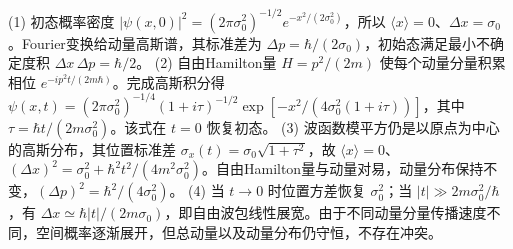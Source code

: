 (1) 初态概率密度 \(|\psi(x,0)|^2=(2\pi\sigma_0^2)^{-1/2}e^{-x^2/(2\sigma_0^2)}\)，所以 \(\langle x\rangle=0\)、\(\Delta x=\sigma_0\)。Fourier变换给动量高斯谱，其标准差为 \(\Delta p=\hbar/(2\sigma_0)\)，初始态满足最小不确定度积 \(\Delta x\,\Delta p=\hbar/2\)。
(2) 自由Hamilton量 \(H=p^2/(2m)\) 使每个动量分量积累相位 \(e^{-ip^2t/(2m\hbar)}\)。完成高斯积分得 \(\psi(x,t)=(2\pi\sigma_0^2)^{-1/4}(1+i\tau)^{-1/2}\exp[-x^2/(4\sigma_0^2(1+i\tau))]\)，其中 \(\tau=\hbar t/(2m\sigma_0^2)\)。该式在 \(t=0\) 恢复初态。
(3) 波函数模平方仍是以原点为中心的高斯分布，其位置标准差 \(\sigma_x(t)=\sigma_0\sqrt{1+\tau^2}\)，故 \(\langle x\rangle=0\)、\((\Delta x)^2=\sigma_0^2+\hbar^2t^2/(4m^2\sigma_0^2)\)。自由Hamilton量与动量对易，动量分布保持不变，\((\Delta p)^2=\hbar^2/(4\sigma_0^2)\)。
(4) 当 \(t\to0\) 时位置方差恢复 \(\sigma_0^2\)；当 \(|t|\gg2m\sigma_0^2/\hbar\)，有 \(\Delta x\simeq\hbar|t|/(2m\sigma_0)\)，即自由波包线性展宽。由于不同动量分量传播速度不同，空间概率逐渐展开，但总动量以及动量分布仍守恒，不存在冲突。
